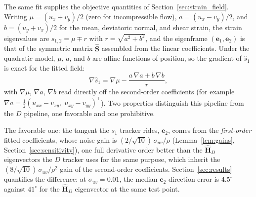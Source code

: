 \documentclass[lettersize,journal]{IEEEtran}
\begin{document}
The same fit supplies the objective quantities of
Section~\ref{sec:strain_field}. Writing $\mu = (u_x + v_y)/2$ (zero for
incompressible flow), $a = (u_x - v_y)/2$, and $b = (u_y + v_x)/2$ for
the mean, deviatoric normal, and shear strain, the strain eigenvalues
are $s_{1,2} = \mu \mp r$ with $r = \sqrt{a^2 + b^2}$, and the
eigenframe $(\mathbf{e}_1, \mathbf{e}_2)$ is that of the symmetric
matrix $\hat{\mathbf{S}}$ assembled from the linear coefficients. Under
the quadratic model, $\mu$, $a$, and $b$ are affine functions of
position, so the gradient of $\hat{s}_1$ is exact for the fitted field:
\begin{equation}
    \nabla \hat{s}_1 = \nabla\mu
    - \frac{a\,\nabla a + b\,\nabla b}{r},
    \label{eq:grad_s1}
\end{equation}
with $\nabla\mu$, $\nabla a$, $\nabla b$ read directly off the
second-order coefficients (for example $\nabla a = \tfrac{1}{2}(u_{xx} -
v_{xy},\; u_{xy} - v_{yy})^\top$). Two properties distinguish this
pipeline from the $D$ pipeline, one favorable and one prohibitive.

The favorable one: the tangent the $s_1$ tracker rides,
$\mathbf{e}_2$, comes from the \emph{first-order} fitted coefficients,
whose noise gain is $(2/\sqrt{10})\,\sigma_{uv}/\rho$
(Lemma~\ref{lem:gains}, Section~\ref{sec:sensitivity}), one full
derivative order better than the
$\hat{\mathbf{H}}_D$ eigenvectors the $D$ tracker uses for the
same purpose, which inherit the $(8/\sqrt{10})\,\sigma_{uv}/\rho^2$
gain of the second-order coefficients. Section~\ref{sec:results}
quantifies the difference: at $\sigma_{uv} = 0.01$, the median
$\mathbf{e}_2$ direction error is $4.5^\circ$ against $41^\circ$ for
the $\hat{\mathbf{H}}_D$ eigenvector at the same test point.
\end{document}
